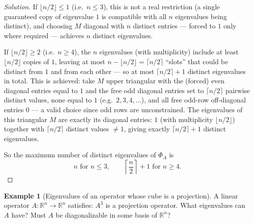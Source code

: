 \documentclass[11pt]{article}
\theoremstyle{definition}
\newtheorem{example}{Example}[section]
\newcommand{\R}{\mathbb{R}}
\begin{document}
\begin{proof}[Solution]
If $\lfloor n/2\rfloor\le1$ (i.e.\ $n\le3$), this is not a real restriction (a single guaranteed copy of eigenvalue $1$ is compatible with all $n$ eigenvalues being distinct), and choosing $M$ diagonal with $n$ distinct entries — forced to $1$ only where required — achieves $n$ distinct eigenvalues.

If $\lfloor n/2\rfloor\ge2$ (i.e.\ $n\ge4$), the $n$ eigenvalues (with multiplicity) include at least $\lfloor n/2\rfloor$ copies of $1$, leaving at most $n-\lfloor n/2\rfloor=\lceil n/2\rceil$ ``slots'' that could be distinct from $1$ and from each other — so at most $\lceil n/2\rceil+1$ distinct eigenvalues in total. This is achieved: take $M$ upper triangular with the (forced) even diagonal entries equal to $1$ and the free odd diagonal entries set to $\lceil n/2\rceil$ pairwise distinct values, none equal to $1$ (e.g.\ $2,3,4,\dots$), and all free odd-row off-diagonal entries $0$ — a valid choice since odd rows are unconstrained. The eigenvalues of this triangular $M$ are exactly its diagonal entries: $1$ (with multiplicity $\lfloor n/2\rfloor$) together with $\lceil n/2\rceil$ distinct values $\neq1$, giving exactly $\lceil n/2\rceil+1$ distinct eigenvalues.

So the maximum number of distinct eigenvalues of $\Phi_A$ is
\[
\boxed{n \text{ for } n\le3, \qquad \left\lceil\frac n2\right\rceil+1 \text{ for } n\ge4}.
\]
\end{proof}

\begin{example}[Eigenvalues of an operator whose cube is a projection]
A linear operator $A:\R^n\to\R^n$ satisfies: $A^3$ is a projection operator. What eigenvalues can $A$ have? Must $A$ be diagonalizable in some basis of $\R^n$?
\end{example}
\end{document}
